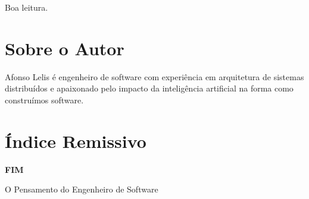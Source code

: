 \documentclass[12pt,a4paper]{book}
\newcommand{\booktitle}{O Pensamento do Engenheiro de Software}
\begin{document}
\vspace{1cm}
\noindent Boa leitura.

\mainmatter
















\backmatter

\cleardoublepage
\chapter*{Sobre o Autor}

Afonso Lelis é engenheiro de software com experiência em arquitetura de sistemas 
distribuídos e apaixonado pelo impacto da inteligência artificial na forma como 
construímos software.

\cleardoublepage
\chapter*{Índice Remissivo}


\cleardoublepage
\begin{center}
    \vspace*{3cm}
    {\Huge\bfseries FIM\par}
    \vspace{1cm}
    {\large\booktitle}
\end{center}

\end{document}
